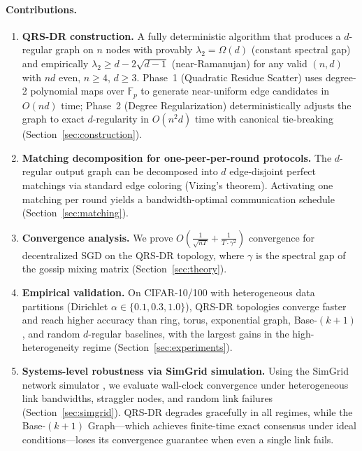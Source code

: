 \documentclass{article}
\newcommand{\lam}{\lambda_2}
\begin{document}
\paragraph{Contributions.}
\begin{enumerate}
\item \textbf{QRS-DR construction.}
    A fully deterministic algorithm that produces a $d$-regular graph on
    $n$ nodes with provably $\lam = \Omega(d)$ (constant spectral gap)
    and empirically $\lam \ge d - 2\sqrt{d-1}$ (near-Ramanujan) for any
    valid $(n,d)$ with $nd$ even, $n \ge 4$, $d \ge 3$.  Phase~1 (Quadratic
    Residue Scatter) uses degree-2 polynomial maps over $\mathbb{F}_p$
    to generate near-uniform edge candidates in $O(nd)$ time; Phase~2
    (Degree Regularization) deterministically adjusts the graph to exact
    $d$-regularity in $O(n^2 d)$ time with canonical tie-breaking
    (Section~\ref{sec:construction}).

\item \textbf{Matching decomposition for one-peer-per-round protocols.}
    The $d$-regular output graph can be decomposed into $d$ edge-disjoint
    perfect matchings via standard edge coloring (Vizing's theorem).
    Activating one matching per round yields a bandwidth-optimal
    communication schedule (Section~\ref{sec:matching}).

\item \textbf{Convergence analysis.}
    We prove $O\!\left(\frac{1}{\sqrt{nT}} +
    \frac{1}{T \cdot \gamma^2}\right)$ convergence for decentralized SGD
    on the QRS-DR topology, where $\gamma$ is the spectral gap
    of the gossip mixing matrix (Section~\ref{sec:theory}).

\item \textbf{Empirical validation.}
    On CIFAR-10/100 with heterogeneous data partitions (Dirichlet
    $\alpha \in \{0.1, 0.3, 1.0\}$), QRS-DR topologies
    converge faster and reach higher accuracy than ring, torus,
    exponential graph, Base-$(k{+}1)$ \cite{takezawa2023base}, and
    random $d$-regular baselines, with the largest gains in the
    high-heterogeneity regime (Section~\ref{sec:experiments}).

\item \textbf{Systems-level robustness via SimGrid simulation.}
    Using the SimGrid network simulator \cite{simgrid2014}, we evaluate
    wall-clock convergence under heterogeneous link bandwidths, straggler
    nodes, and random link failures (Section~\ref{sec:simgrid}).
    QRS-DR degrades gracefully in all regimes, while the
    Base-$(k{+}1)$ Graph---which achieves finite-time exact consensus
    under ideal conditions---loses its convergence guarantee when even a
    single link fails.
\end{enumerate}
\end{document}
